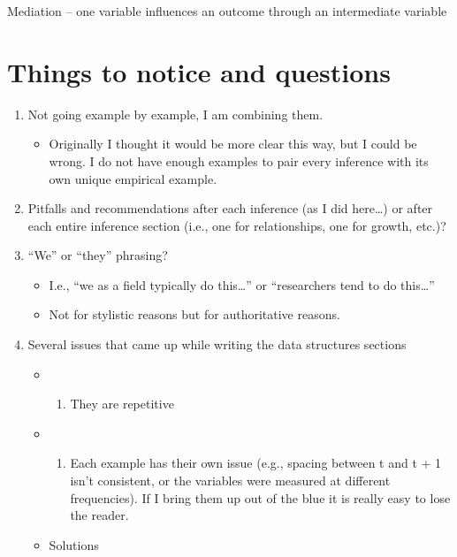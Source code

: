 \documentclass[]{article}
\providecommand{\tightlist}{%
  \setlength{\itemsep}{0pt}\setlength{\parskip}{0pt}}
\begin{document}
Mediation -- one variable influences an outcome through an intermediate
variable

\hypertarget{things-to-notice-and-questions}{%
\section{Things to notice and
questions}\label{things-to-notice-and-questions}}

\begin{enumerate}
\def\labelenumi{\arabic{enumi})}
\item
  Not going example by example, I am combining them.

  \begin{itemize}
  \tightlist
  \item
    Originally I thought it would be more clear this way, but I could be
    wrong. I do not have enough examples to pair every inference with
    its own unique empirical example.
  \end{itemize}
\item
  Pitfalls and recommendations after each inference (as I did
  here\ldots{}) or after each entire inference section (i.e., one for
  relationships, one for growth, etc.)?
\item
  ``We'' or ``they'' phrasing?

  \begin{itemize}
  \item
    I.e., ``we as a field typically do this\ldots{}'' or ``researchers
    tend to do this\ldots{}''
  \item
    Not for stylistic reasons but for authoritative reasons.
  \end{itemize}
\item
  Several issues that came up while writing the data structures sections

  \begin{itemize}
  \item
    \begin{enumerate}
    \def\labelenumii{\arabic{enumii})}
    \tightlist
    \item
      They are repetitive
    \end{enumerate}
  \item
    \begin{enumerate}
    \def\labelenumii{\arabic{enumii})}
    \setcounter{enumii}{1}
    \tightlist
    \item
      Each example has their own issue (e.g., spacing between t and t +
      1 isn't consistent, or the variables were measured at different
      frequencies). If I bring them up out of the blue it is really easy
      to lose the reader.
    \end{enumerate}
  \item
    Solutions


\end{itemize}
\end{enumerate}
\end{document}
